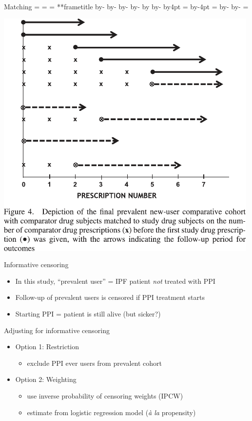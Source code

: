 \documentclass[aspectratio=169,12pt]{beamer} %
\makeatletter
\newif\ifsidebartheme
\newcommand*{\calculatespace}{%
    \contentheight=\paperheight%
    \ifx\beamer@frametitle\@empty%
        \setbox\@tempboxa=\box\voidb@x%
      \else%
        \setbox\@tempboxa=\vbox{%
          \vbox{}%
          {\parskip0pt\usebeamertemplate***{frametitle}}%
        }%
        \ifsidebartheme%
          \advance\contentheight by-1em%
        \fi%
      \fi%
    \advance\contentheight by-\ht\@tempboxa%
    \advance\contentheight by-\dp\@tempboxa%
    \advance\contentheight by-\beamer@frametopskip%
    \ifbeamer@plainframe%
    \contentbottom=0pt%
    \else%
    \advance\contentheight by-\headheight%
    \advance\contentheight by\headdp%
    \advance\contentheight by-\footheight%
    \advance\contentheight by4pt%
    \contentbottom=\footheight%
    \advance\contentbottom by-4pt%
    \fi%
    \contentwidth=\paperwidth%
    \ifbeamer@plainframe%
    \contentleft=0pt%
    \else%
    \advance\contentwidth by-\beamer@rightsidebar%
    \advance\contentwidth by-\beamer@leftsidebar\relax%
    \contentleft=\beamer@leftsidebar%
    \fi%
}
\makeatother
\begin{document}
\begin{frame}{Matching}
    \calculatespace%
    \begin{center}
	\includegraphics[height=0.85\contentheight]{ref/suimoodell-fig4.pdf}
    \end{center}
\end{frame}

\begin{frame}{Informative censoring}
    \begin{itemize}
	\item In this study, ``prevalent user'' = IPF patient \emph{not}
	      treated with PPI
	\item Follow-up of prevalent users is censored if PPI treatment starts
	\item Starting PPI = patient is still alive (but sicker?)
    \end{itemize}
\end{frame}

\begin{frame}{Adjusting for informative censoring}
    \begin{itemize}
	\item Option 1: Restriction
	\begin{itemize}
	    \item exclude PPI ever users from prevalent cohort
	\end{itemize}
	\item Option 2: Weighting
	\begin{itemize}
	    \item use inverse probability of censoring weights (IPCW)
	    \item estimate from logistic regression model (\emph{\`{a} la} propensity)
	\end{itemize}
    \end{itemize}
\end{frame}
\end{document}
